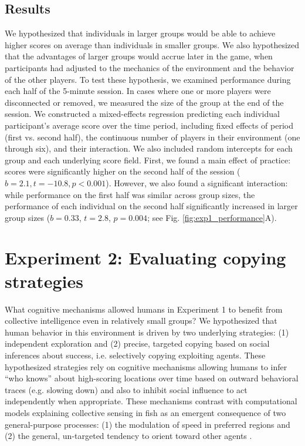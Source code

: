 \documentclass[12pt,letterpaper]{article}
\begin{document}
\subsection{Results}

We hypothesized that individuals in larger groups would be able to achieve higher scores on average than individuals in smaller groups. 
We also hypothesized that the advantages of larger groups would accrue later in the game, when participants had adjusted to the mechanics of the environment and the behavior of the other players.
To test these hypothesis, we examined performance during each half of the 5-minute session. 
In cases where one or more players were disconnected or removed, we measured the size of the group at the end of the session.
We constructed a mixed-effects regression predicting each individual participant's average score over the time period, including fixed effects of period (first vs. second half), the continuous number of players in their environment (one through six), and their interaction.
We also included random intercepts for each group and each underlying score field.
First, we found a main effect of practice: scores were significantly higher on the second half of the session ($b = 2.1,t=-10.8, p < 0.001$).
However, we also found a significant interaction: while performance on the first half was similar across group sizes, the performance of each individual on the second half significantly increased in larger group sizes ($b = 0.33$, $t = 2.8$, $p = 0.004$; see Fig. \ref{fig:exp1_performance}A). 

\section{Experiment 2: Evaluating copying strategies}


What cognitive mechanisms allowed humans in Experiment 1 to benefit from collective intelligence even in relatively small groups?
We hypothesized that human behavior in this environment is driven by two underlying strategies: (1) independent exploration and (2) precise, targeted copying based on social inferences about success, i.e. selectively copying exploiting agents. 
These hypothesized strategies rely on cognitive mechanisms allowing humans to infer ``who knows'' about high-scoring locations over time based on outward behavioral traces (e.g. slowing down) and also to inhibit social influence to act independently when appropriate.
These mechanisms contrast with computational models explaining collective sensing in fish as an emergent consequence of two general-purpose processes: (1) the modulation of speed in preferred regions and (2) the general, un-targeted tendency to orient toward other agents \cite{berdahl_emergent_2013}.
\end{document}
